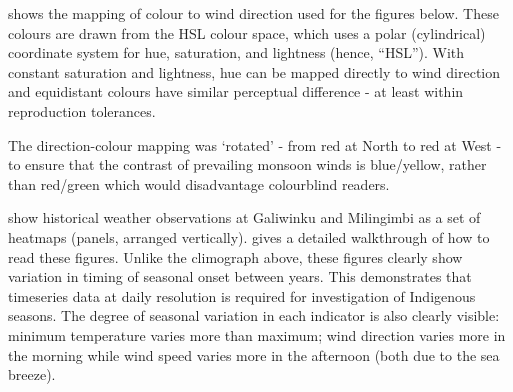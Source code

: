  shows the mapping of colour to wind direction used
for the figures below.  These colours are drawn from the HSL colour space,
which uses a polar (cylindrical) coordinate system for hue, saturation,
and lightness (hence, ``HSL'').  With constant saturation and lightness,
hue can be mapped directly to wind direction and equidistant colours
have similar perceptual difference - at least within reproduction tolerances.

The direction-colour mapping was `rotated' - from red at North to red at West -
to ensure that the contrast of prevailing monsoon winds is blue/yellow,
rather than red/green which would disadvantage colourblind readers.

show historical weather observations at Galiwinku and Milingimbi as a set of
heatmaps (panels, arranged vertically).  
gives a detailed walkthrough of how to read these figures.
%
Unlike the climograph above, these figures clearly show variation in timing
of seasonal onset between years.  This demonstrates that timeseries data
at daily resolution is required for investigation of Indigenous seasons.
%
The degree of seasonal variation in each indicator is also clearly visible:
minimum temperature varies more than maximum; wind direction varies more in
the morning while wind speed varies more in the afternoon (both due to the
sea breeze).


%

\clearpage

